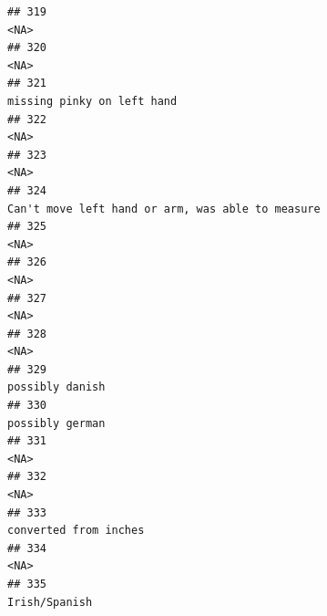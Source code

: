 \documentclass[]{article}
\begin{document}
\begin{verbatim}
## 319                                                                                                                                                <NA>
## 320                                                                                                                                                <NA>
## 321                                                                                                                          missing pinky on left hand
## 322                                                                                                                                                <NA>
## 323                                                                                                                                                <NA>
## 324                                                                                                    Can't move left hand or arm, was able to measure
## 325                                                                                                                                                <NA>
## 326                                                                                                                                                <NA>
## 327                                                                                                                                                <NA>
## 328                                                                                                                                                <NA>
## 329                                                                                                                                     possibly danish
## 330                                                                                                                                     possibly german
## 331                                                                                                                                                <NA>
## 332                                                                                                                                                <NA>
## 333                                                                                                                               converted from inches
## 334                                                                                                                                                <NA>
## 335                                                                                                                                       Irish/Spanish

\end{verbatim}
\end{document}
